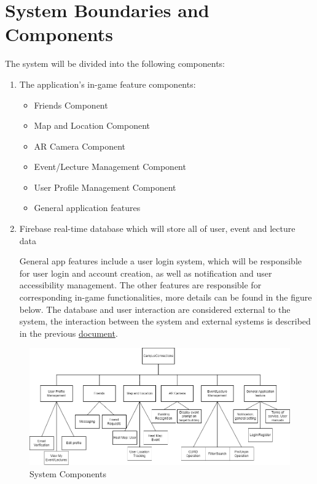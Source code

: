 \documentclass{article}
\begin{document}
\section{System Boundaries and Components}
The system will be divided into the following components:
\begin{enumerate}
	\item The application's in-game feature components:
	      \begin{itemize}
		      \item Friends Component
		      \item Map and Location Component
		      \item AR Camera Component
		      \item Event/Lecture Management Component
		      \item User Profile Management Component
		      \item General application features
	      \end{itemize}
	\item Firebase real-time database which will store all of user, event and lecture data
	
\quad General app features include a user login system, which will be responsible for user login and account creation, as well as notification and user accessibility management. The other features are responsible for corresponding in-game functionalities, more details can be found in the figure below. The database and user interaction are considered external to the system, the interaction between the system and external systems is described in the previous \href{https://github.com/beatlepie/4G06CapstoneProjectTeam2/blob/docs-hazard-analysis/docs/SRS-Volere/SRS.pdf}{document}.
\end{enumerate}
\begin{figure}[H]
\begin{center}
\includegraphics[scale=0.4]{components.png}
\end{center}
\caption{System Components}
\end{figure}
\end{document}
